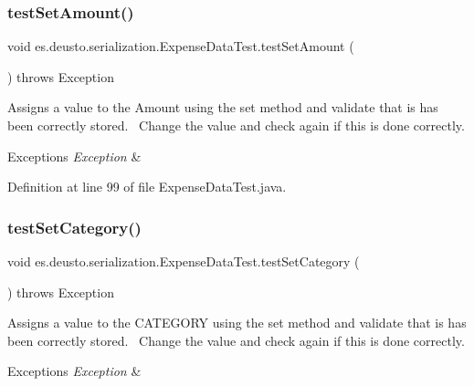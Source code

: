 \subsubsection{\texorpdfstring{test\+Set\+Amount()}{testSetAmount()}}
{\footnotesize\ttfamily void es.\+deusto.\+serialization.\+Expense\+Data\+Test.\+test\+Set\+Amount (\begin{DoxyParamCaption}{ }\end{DoxyParamCaption}) throws Exception}

Assigns a value to the Amount using the set method and validate that is has been correctly stored.~\newline
Change the value and check again if this is done correctly. 
\begin{DoxyExceptions}{Exceptions}
{\em Exception} & \\
\hline
\end{DoxyExceptions}


Definition at line 99 of file Expense\+Data\+Test.\+java.

\mbox{\label{classes_1_1deusto_1_1serialization_1_1_expense_data_test_a3b5cd1baa1d480f9f5f1e484161a5cee}} 
\subsubsection{\texorpdfstring{test\+Set\+Category()}{testSetCategory()}}
{\footnotesize\ttfamily void es.\+deusto.\+serialization.\+Expense\+Data\+Test.\+test\+Set\+Category (\begin{DoxyParamCaption}{ }\end{DoxyParamCaption}) throws Exception}

Assigns a value to the C\+A\+T\+E\+G\+O\+RY using the set method and validate that is has been correctly stored.~\newline
Change the value and check again if this is done correctly. 
\begin{DoxyExceptions}{Exceptions}
{\em Exception} & \\
\hline
\end{DoxyExceptions}



